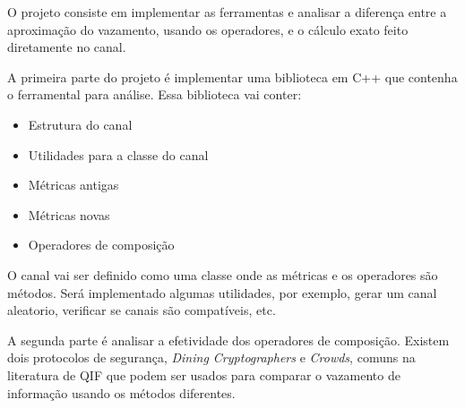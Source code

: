 %
%
%
%

O projeto consiste em implementar as ferramentas e analisar a diferença entre a aproximação do vazamento, usando os operadores, e o cálculo exato feito diretamente no canal.

A primeira parte do projeto é implementar uma biblioteca em C++ que contenha o ferramental para análise. Essa biblioteca vai conter:

\begin{itemize}
  \item{Estrutura do canal}
  \item{Utilidades para a classe do canal}
  \item{Métricas antigas}
  \item{Métricas novas}
  \item{Operadores de composição}
\end{itemize}

O canal vai ser definido como uma classe onde as métricas e os operadores são métodos. 
Será implementado algumas utilidades, por exemplo, gerar um canal aleatorio, verificar se canais são compatíveis, etc.

A segunda parte é analisar a efetividade dos operadores de composição.
Existem dois protocolos de segurança, \emph{Dining Cryptographers}\cite{Chaum:88:JC} e \emph{Crowds}\cite{Reiter:98:TISS}, comuns na literatura de QIF que podem ser usados para comparar o vazamento de informação usando os métodos diferentes.
